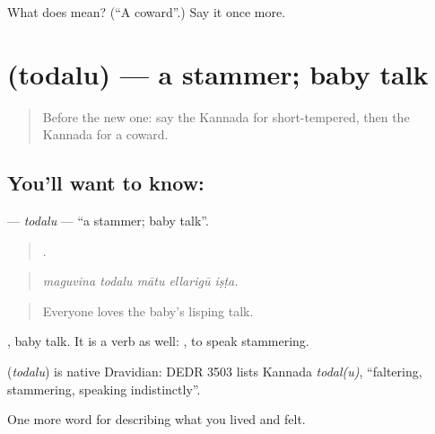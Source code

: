 \begin{tcolorbox}[breakable,colback=teal!4,colframe=teal!35!black,title={Before you move on}]
What does  mean? (\textquotedblleft{}A coward\textquotedblright{}.) Say it once more.
\end{tcolorbox}
\section[\texorpdfstring{\kn{ತೊದಲು} (todalu)}{ತೊದಲು (todalu)}]{ (todalu) — a stammer; baby talk}

\label{lesson:KA-C504-todalu}



\begin{quote}
Before the new one: say the Kannada for short-tempered, then the Kannada for a coward.
\end{quote}

\subsection*{You'll want to know: }
\textbf{} — \emph{todalu} — \textquotedblleft{}a stammer; baby talk\textquotedblright{}.

\begin{quote}
    .
\end{quote}

\begin{quote}
\emph{maguvina todalu mātu ellarigū iṣṭa.}
\end{quote}

\begin{quote}
Everyone loves the baby's lisping talk.
\end{quote}

 , baby talk. It is a verb as well:  , to speak stammering.

\begin{cousinweb}
\textbf{} (\emph{todalu}) is native Dravidian: DEDR 3503 lists Kannada \emph{todal(u)}, \textquotedblleft{}faltering, stammering, speaking indistinctly\textquotedblright{}.
\end{cousinweb}

\begin{grammarlens}[title={What you've built}]
One more word for describing what you lived and felt.
\end{grammarlens}

